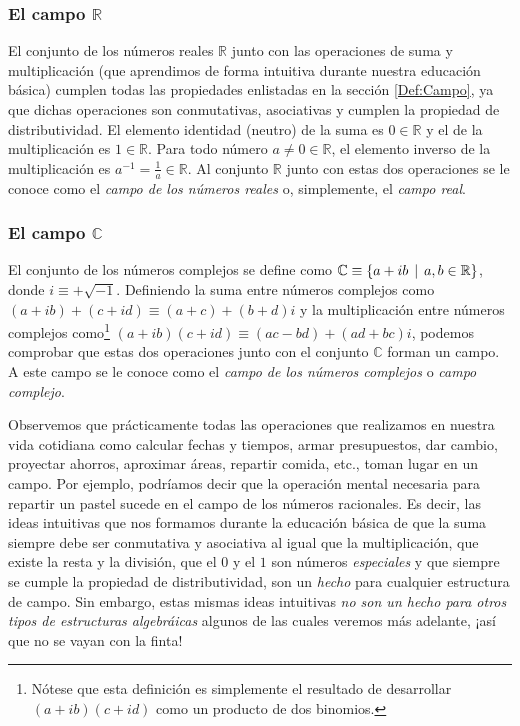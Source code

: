 \documentclass[12pt]{article}
\begin{document}
\subsubsection{El campo $\mathbb{R}$}

El conjunto de los números reales $\mathbb{R}$ junto con las operaciones de suma y multiplicación (que aprendimos de forma intuitiva durante nuestra educación básica) cumplen todas las propiedades enlistadas en la sección \ref{Def:Campo}, ya que dichas operaciones son conmutativas, asociativas y cumplen la propiedad de distributividad. El elemento identidad (neutro) de la suma es $0\in\mathbb{R}$ y el de la multiplicación es $1\in\mathbb{R}$. Para todo número $a\neq0\in\mathbb{R}$, el elemento inverso de la multiplicación es $a^{-1} = \frac{1}{a}\in\mathbb{R}$. Al conjunto $\mathbb{R}$ junto con estas dos operaciones se le conoce como el \emph{campo de los números reales} o, simplemente, el \emph{campo real}.

\subsubsection{El campo $\mathbb{C}$} \label{Ejem:Campo_complejo}

El conjunto de los números complejos se define como $\mathbb{C} \equiv \{a+ib\hspace{1.5mm}|\hspace{1.5mm}a,b\in\mathbb{R}\}$, donde $i\equiv+\sqrt{-1}$. Definiendo la suma entre números complejos como $(a+ib)+(c+id)\equiv(a+c) + (b+d)i$ y la multiplicación entre números complejos como\footnote{Nótese que esta definición es simplemente el resultado de desarrollar $(a+ib)(c+id)$ como un producto de dos binomios.} $(a+ib)(c+id)\equiv (ac-bd) + (ad+bc)i$, podemos comprobar que estas dos operaciones junto con el conjunto $\mathbb{C}$ forman un campo. A este campo se le conoce como el \emph{campo de los números complejos} o \emph{campo complejo}.

\vspace{3mm}

Observemos que prácticamente todas las operaciones que realizamos en nuestra vida cotidiana como calcular fechas y tiempos, armar presupuestos, dar cambio, proyectar ahorros, aproximar áreas, repartir comida, etc., toman lugar en un campo. Por ejemplo, podríamos decir que la operación mental necesaria para repartir un pastel sucede en el campo de los números racionales. Es decir, las ideas intuitivas que nos formamos durante la educación básica de que la suma siempre debe ser conmutativa y asociativa \textemdash al igual que la multiplicación\textemdash\hspace{0.5mm}, que existe la resta y la división, que el $0$ y el $1$ son números \emph{especiales} y que siempre se cumple la propiedad de distributividad, son un \emph{hecho} para cualquier estructura de campo. Sin embargo, estas mismas ideas intuitivas \emph{no son un hecho para otros tipos de estructuras algebráicas} \textemdash algunos de las cuales veremos más adelante\textemdash\hspace{0.5mm}, ¡así que no se vayan con la finta!
\end{document}
